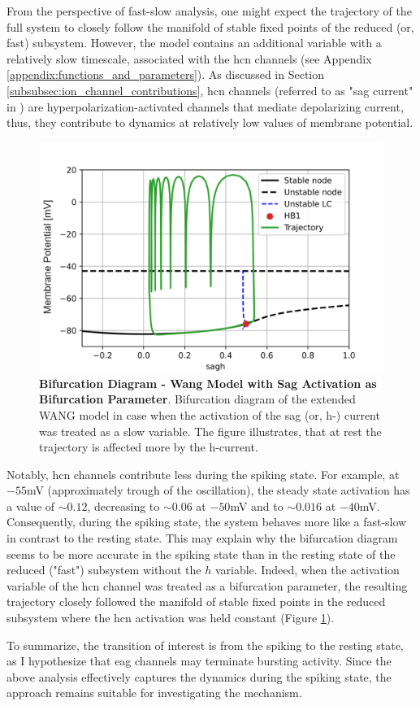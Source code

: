 \documentclass[../main.tex]{subfiles}
\begin{document}
From the perspective of fast-slow analysis, one might expect the trajectory of the full system to closely follow the manifold of stable fixed points of the reduced (or, fast) subsystem. However, the model contains an additional variable with a relatively slow timescale, associated with the \gls{hcn} channels (see Appendix \ref{appendix:functions_and_parameters}). As discussed in Section \ref{subsubsec:ion_channel_contributions}, \gls{hcn} channels (referred to as "sag current" in \parencite{wangMultipleDynamicalModes1994}) are hyperpolarization-activated channels that mediate depolarizing current, thus, they contribute to dynamics at relatively low values of membrane potential.



\begin{figure}[!t]
    \centering
    \includegraphics[width=0.55\linewidth]{../img/spiking_to_bursting/bifurcation_wang_sagh.png}
    \caption[Bifurcation Diagram - Wang Model with Sag Activation as Bifurcation Parameter]{
        \textbf{Bifurcation Diagram - Wang Model with Sag Activation as Bifurcation Parameter}. Bifurcation diagram of the extended WANG model in case when the activation of the sag (or, h-) current was treated as a slow variable. The figure illustrates, that at rest the trajectory is affected more by the h-current.
    }
    \label{fig:spiking_to_bursting_wang_bifurcation_sagh}
\end{figure}

Notably, \gls{hcn} channels contribute less during the spiking state. For example, at $-55$mV (approximately trough of the oscillation), the steady state activation has a value of $\sim 0.12$, decreasing to $\sim 0.06$ at $-50$mV and to $\sim 0.016$ at $-40$mV. Consequently, during the spiking state, the system behaves more like a fast-slow in contrast to the resting state. This may explain why the bifurcation diagram seems to be more accurate in the spiking state than in the resting state of the reduced ("fast") subsystem without the $h$ variable. Indeed, when the activation variable of the \gls{hcn} channel was treated as a bifurcation parameter, the resulting trajectory closely followed the manifold of stable fixed points in the reduced subsystem where the \gls{hcn} activation was held constant (Figure \ref{fig:spiking_to_bursting_wang_bifurcation_sagh}).

To summarize, the transition of interest is from the spiking to the resting state, as I hypothesize that \gls{eag} channels may terminate bursting activity. Since the above analysis effectively captures the dynamics during the spiking state, the approach remains suitable for investigating the mechanism.
\end{document}
